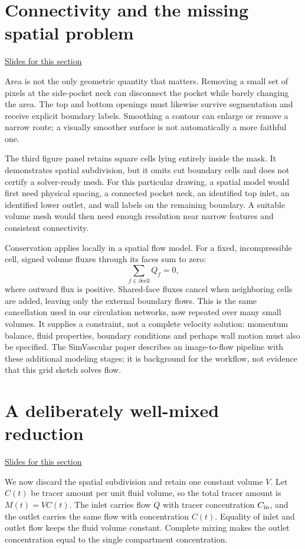 \documentclass[11pt,letterpaper]{article}
\theoremstyle{definition}\newtheorem{definition}{Definition}\newtheorem{example}{Example}
\numberwithin{equation}{section}
\begin{document}
\section{Connectivity and the missing spatial problem}
\hypertarget{note-connectivity-and-the-missing-spatial-problem}{}\label{note:connectivity-and-the-missing-spatial-problem}
{\small \href{slides.html\#frame=a-small-area-change-can-alter-a-route\&step=1}{Slides for this section}}\par
Area is not the only geometric quantity that matters. Removing a small set of pixels at the side-pocket neck can disconnect the pocket while barely changing the area. The top and bottom openings must likewise survive segmentation and receive explicit boundary labels. Smoothing a contour can enlarge or remove a narrow route; a visually smoother surface is not automatically a more faithful one.

The third figure panel retains square cells lying entirely inside the mask. It demonstrates spatial subdivision, but it omits cut boundary cells and does not certify a solver-ready mesh. For this particular drawing, a spatial model would first need physical spacing, a connected pocket neck, an identified top inlet, an identified lower outlet, and wall labels on the remaining boundary. A suitable volume mesh would then need enough resolution near narrow features and consistent connectivity.

Conservation applies locally in a spatial flow model. For a fixed, incompressible cell, signed volume fluxes through its faces sum to zero:
\begin{equation}\sum_{f\in\partial\text{cell}}Q_f=0,\end{equation}
where outward flux is positive. Shared-face fluxes cancel when neighboring cells are added, leaving only the external boundary flows. This is the same cancellation used in our circulation networks, now repeated over many small volumes. It supplies a constraint, not a complete velocity solution: momentum balance, fluid properties, boundary conditions and perhaps wall motion must also be specified. The SimVascular paper describes an image-to-flow pipeline with these additional modeling stages; it is background for the workflow, not evidence that this grid sketch solves flow.
\section{A deliberately well-mixed reduction}
\hypertarget{note-a-deliberately-well-mixed-reduction}{}\label{note:a-deliberately-well-mixed-reduction}
{\small \href{slides.html\#frame=reduce-the-region-to-one-mixed-volume\&step=1}{Slides for this section}}\par
We now discard the spatial subdivision and retain one constant volume $V$. Let $C(t)$ be tracer amount per unit fluid volume, so the total tracer amount is $M(t)=VC(t)$. The inlet carries flow $Q$ with tracer concentration $C_{\rm in}$, and the outlet carries the same flow with concentration $C(t)$. Equality of inlet and outlet flow keeps the fluid volume constant. Complete mixing makes the outlet concentration equal to the single compartment concentration.
\end{document}
